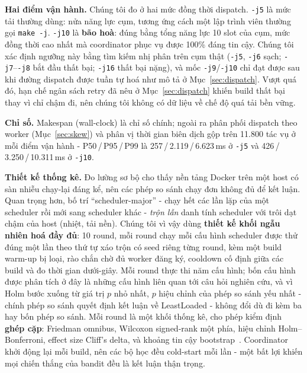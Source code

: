 \documentclass[final,5p,times,twocolumn]{elsarticle}
\begin{document}
\textbf{Hai điểm vận hành.} Chúng tôi đo ở hai mức đồng thời dispatch. \texttt{-j5} là mức tải thường dùng: nửa năng lực cụm, tương ứng cách một lập trình viên thường gọi \texttt{make -j}. \texttt{-j10} là \textbf{bão hoà}: đúng bằng tổng năng lực 10 slot của cụm, mức đồng thời cao nhất mà coordinator phục vụ được 100\% đáng tin cậy. Chúng tôi xác định ngưỡng này bằng tìm kiếm nhị phân trên cụm thật (\texttt{-j5}, \texttt{-j6} sạch; \texttt{-j7}--\texttt{-j8} bắt đầu thất bại; \texttt{-j16} thất bại nặng), và mốc \texttt{-j9}/\texttt{-j10} chỉ đạt được sau khi đường dispatch được tuần tự hoá như mô tả ở Mục~\ref{sec:dispatch}. Vượt quá đó, hạn chế ngân sách retry đã nêu ở Mục~\ref{sec:dispatch} khiến build thất bại thay vì chỉ chậm đi, nên chúng tôi không có dữ liệu về chế độ quá tải bền vững.

\textbf{Chỉ số.} Makespan (wall-clock) là chỉ số chính; ngoài ra phân phối dispatch theo worker (Mục~\ref{sec:skew}) và phân vị thời gian biên dịch gộp trên 11.800 tác vụ ở mỗi điểm vận hành - P50\,/\,P95\,/\,P99 là 257\,/\,2.119\,/\,6.623\,ms ở \texttt{-j5} và 426\,/\,3.250\,/\,10.311\,ms ở \texttt{-j10}.

\textbf{Thiết kế thống kê.} Đo lường sơ bộ cho thấy nền tảng Docker trên một host có sàn nhiễu chạy-lại đáng kể, nên các phép so sánh chạy đơn không đủ để kết luận. Quan trọng hơn, bố trí ``scheduler-major'' - chạy hết các lần lặp của một scheduler rồi mới sang scheduler khác - \emph{trộn lẫn} danh tính scheduler với trôi dạt chậm của host (nhiệt, tải nền). Chúng tôi vì vậy dùng \textbf{thiết kế khối ngẫu nhiên hoá đầy đủ}: 10 round, mỗi round chạy mỗi cấu hình scheduler được thử đúng một lần theo thứ tự xáo trộn có seed riêng từng round, kèm một build warm-up bị loại, rào chắn chờ đủ worker đăng ký, cooldown cố định giữa các build và đo thời gian dưới-giây. Mỗi round thực thi năm cấu hình; bốn cấu hình được phân tích ở đây là những cấu hình liên quan tới câu hỏi nghiên cứu, và vì Holm bước xuống từ giá trị $p$ nhỏ nhất, $p$ hiệu chỉnh của phép so sánh yếu nhất - chính phép so sánh quyết định kết luận về LeastLoaded - không đổi dù đi kèm ba hay bốn phép so sánh. Mỗi round là một khối thống kê, cho phép kiểm định \textbf{ghép cặp}: Friedman omnibus, Wilcoxon signed-rank một phía, hiệu chỉnh Holm--Bonferroni, effect size Cliff's delta, và khoảng tin cậy bootstrap~\cite{wilcoxon1945,holm1979,friedman1937,cliff1993}. Coordinator khởi động lại mỗi build, nên các bộ học đều cold-start mỗi lần - một bất lợi khiến mọi chiến thắng của bandit đều là kết luận thận trọng.
\end{document}
